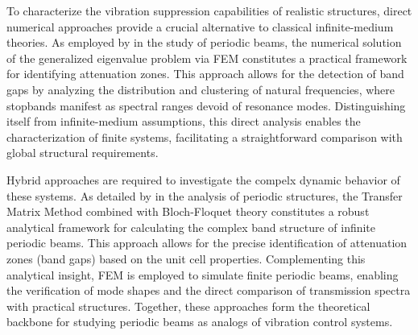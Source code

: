 

To characterize the vibration suppression capabilities of realistic structures, direct numerical approaches provide a crucial alternative to classical infinite-medium theories. As employed by \textcite{Domagalski2021} in the study of periodic beams, the numerical solution of the generalized eigenvalue problem via FEM constitutes a practical framework for identifying attenuation zones. This approach allows for the detection of band gaps by analyzing the distribution and clustering of natural frequencies, where stopbands manifest as spectral ranges devoid of resonance modes. Distinguishing itself from infinite-medium assumptions, this direct analysis enables the characterization of finite systems, facilitating a straightforward comparison with global structural requirements.

Hybrid approaches are required to investigate the compelx dynamic behavior of these systems. As detailed by \textcite{Reis2024} in the analysis of periodic structures, the Transfer Matrix Method combined with Bloch-Floquet theory constitutes a robust analytical framework for calculating the complex band structure of infinite periodic beams. This approach allows for the precise identification of attenuation zones (band gaps) based on the unit cell properties. Complementing this analytical insight, FEM is employed to simulate finite periodic beams, enabling the verification of mode shapes and the direct comparison of transmission spectra with practical structures. Together, these approaches form the theoretical backbone for studying periodic beams as analogs of vibration control systems.

